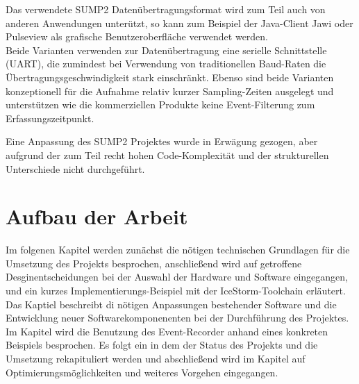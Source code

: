 Das verwendete SUMP2 Datenübertragungsformat wird zum Teil auch von anderen Anwendungen unterützt, so kann zum Beispiel der Java-Client Jawi\cite{web:ols} oder Pulseview\cite{web:sigrok_ols} als grafische Benutzeroberfläche verwendet werden.\\ 
Beide Varianten verwenden zur Datenübertragung eine serielle Schnittstelle (\acrshort{UART}), die zumindest bei Verwendung von traditionellen Baud-Raten die Übertragungsgeschwindigkeit stark einschränkt. Ebenso sind beide Varianten konzeptionell für die Aufnahme relativ kurzer Sampling-Zeiten ausgelegt und unterstützen wie die kommerziellen Produkte keine Event-Filterung zum Erfassungszeitpunkt.  

Eine Anpassung des SUMP2 Projektes wurde in Erwägung gezogen, aber aufgrund der zum Teil recht hohen Code-Komplexität und der strukturellen Unterschiede nicht durchgeführt.


\section{Aufbau der Arbeit}
\label{ch:Einfuehrung:Aufbau}

Im folgenen Kapitel  werden zunächst die nötigen technischen Grundlagen für die Umsetzung des Projekts besprochen, anschließend wird auf getroffene Desginentscheidungen bei der Auswahl der Hardware und Software eingegangen, und ein kurzes Implementierungs-Beispiel mit der IceStorm-Toolchain erläutert.
Das Kaptiel  beschreibt di nötigen Anpassungen bestehender Software und die Entwicklung neuer Softwarekomponenenten bei der Durchführung des Projektes.
Im Kapitel  wird die Benutzung des Event-Recorder anhand eines konkreten Beispiels besprochen.
Es folgt ein  in dem der Status des Projekts und die Umsetzung rekapituliert werden und abschließend wird im Kapitel  auf Optimierungsmöglichkeiten und weiteres Vorgehen eingegangen.





